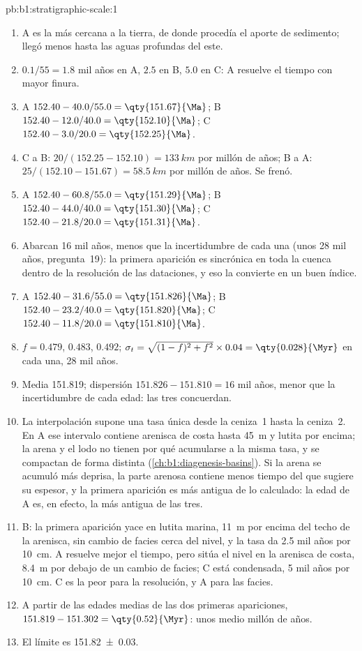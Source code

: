 \begin{solution}{pb:b1:stratigraphic-scale:1}
\begin{enumerate}
  \item A es la más cercana a la tierra, de donde procedía el aporte de sedimento; llegó menos hasta las aguas profundas del este.
  \item $0.1/55 = \num{1.8}$ mil años en A, $\num{2.5}$ en B, $\num{5.0}$ en C: A resuelve el tiempo con mayor finura.
  \item A $152.40 - 40.0/55.0 = \qty{151.67}{\Ma}$; B $152.40 - 12.0/40.0 =
        \qty{152.10}{\Ma}$; C $152.40 - 3.0/20.0 = \qty{152.25}{\Ma}$.
  \item C a B: $20/(152.25 - 152.10) = \qty{133}{km}$ por millón de años; B a A:
        $25/(152.10 - 151.67) = \qty{58.5}{km}$ por millón de años. Se frenó.
  \item A $152.40 - 60.8/55.0 = \qty{151.29}{\Ma}$; B $152.40 - 44.0/40.0 =
        \qty{151.30}{\Ma}$; C $152.40 - 21.8/20.0 = \qty{151.31}{\Ma}$.
  \item Abarcan \num{16} mil años, menos que la incertidumbre de cada una (unos \num{28} mil años, pregunta~19): la primera aparición es sincrónica en toda la cuenca dentro de la resolución de las dataciones, y eso la convierte en un buen índice.
  \item A $152.40 - 31.6/55.0 = \qty{151.826}{\Ma}$; B $152.40 - 23.2/40.0 =
        \qty{151.820}{\Ma}$; C $152.40 - 11.8/20.0 = \qty{151.810}{\Ma}$.
  \item $f = 0.479$, $0.483$, $0.492$; $\sigma_t = \sqrt{(1 - f)^2 + f^2} \times
        0.04 = \qty{0.028}{\Myr}$ en cada una, \num{28} mil años.
  \item Media \qty{151.819}{\Ma}; dispersión $151.826 - 151.810 = \num{16}$ mil años, menor que la incertidumbre de cada edad: las tres concuerdan.
  \item La interpolación supone una tasa única desde la ceniza~1 hasta la ceniza~2. En A ese intervalo contiene arenisca de costa hasta \qty{45}{m} y lutita por encima; la arena y el lodo no tienen por qué acumularse a la misma tasa, y se compactan de forma distinta (\cref{ch:b1:diagenesis-basins}). Si la arena se acumuló más deprisa, la parte arenosa contiene menos tiempo del que sugiere su espesor, y la primera aparición es más antigua de lo calculado: la edad de A es, en efecto, la más antigua de las tres.
  \item B: la primera aparición yace en lutita marina, \qty{11}{m} por encima del techo de la arenisca, sin cambio de facies cerca del nivel, y la tasa da \num{2.5} mil años por \qty{10}{cm}. A resuelve mejor el tiempo, pero sitúa el nivel en la arenisca de costa, \qty{8.4}{m} por debajo de un cambio de facies; C está condensada, \num{5} mil años por \qty{10}{cm}. C es la peor para la resolución, y A para las facies.
  \item A partir de las edades medias de las dos primeras apariciones, $151.819 - 151.302 =
        \qty{0.52}{\Myr}$: unos medio millón de años.
  \item El límite es \qty[uncertainty-mode=separate]{151.82(3)}{\Ma}.
\end{enumerate}
\end{solution}
